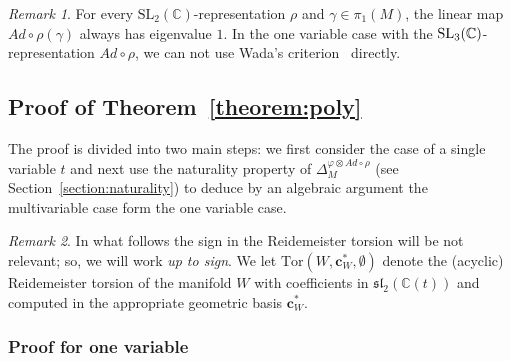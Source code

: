 \documentclass[a4paper]{amsart}
\theoremstyle{plain}
\theoremstyle{definition}
\theoremstyle{remark}
\newtheorem{remark}{Remark}%
\newcommand{\CC}{{\mathbb C}}
\newcommand{\SL}{{\mathrm{SL}_2(\CC)}}
\newcommand{\sllt}{\mathfrak{sl}_2(\CC(t))}
\newcommand{\PolyTors}[2]{\Delta_{#1}^{#2}}
\newcommand{\Tor}[3]{\mathrm{Tor} ({#1}, {#2}, {#3})}
\newcommand{\otAd}[2]{#1 \otimes Ad \circ #2}
\newcommand{\cbasis}[2][c]{\mathbf{#1}^{#2}}
\begin{document}

\begin{remark}
For every $\SL$-representation $\rho$ and $\gamma \in \pi_1(M)$,
the linear map $Ad \circ \rho(\gamma)$ always has eigenvalue $1$.
In the one variable case with the ${\rm SL}_3(\CC)$-representation $Ad \circ \rho$, 
we can not use Wada's criterion~\cite[Proposition 8]{Wada94} directly.
\end{remark}

\subsection{Proof of Theorem~\ref{theorem:poly}}

The proof is divided into two main steps: we first consider the case
of a single variable $t$ and next use the naturality property of
$\PolyTors{M}{\otAd{\varphi}{\rho}}$ (see Section~\ref{section:naturality}) to deduce by an algebraic
argument the multivariable case form the one variable case.

\begin{remark}
  In what follows the sign in the Reidemeister torsion will be not
  relevant; so, we will work \emph{up to sign}.  We let
  $\Tor{W}{\cbasis{*}_W}{\emptyset}$ denote 
  the (acyclic) Reidemeister torsion of the manifold $W$ with 
  coefficients in $\sllt$ and computed in 
  the appropriate geometric basis $\cbasis{*}_W$.
\end{remark}

\subsubsection{Proof for one variable}
\end{document}
